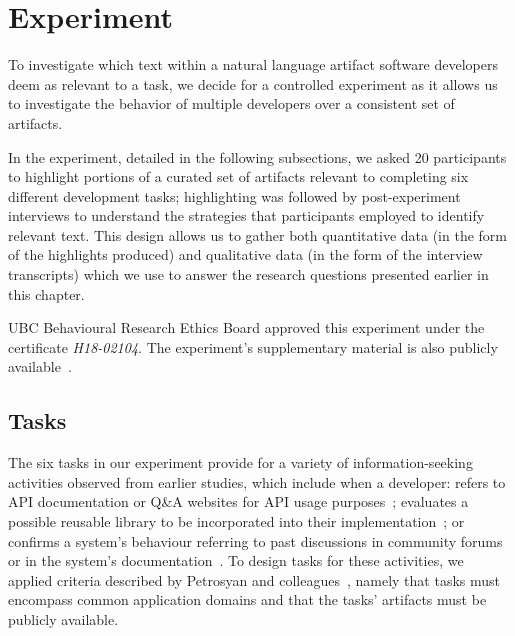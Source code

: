 
\section{Experiment}
\label{cp3:experiment}



To investigate which text within a natural language artifact software developers deem as relevant to a task,
 we decide for a controlled experiment
 as it allows us to investigate the behavior of multiple developers
over a consistent set of artifacts.



In the experiment, detailed in the following subsections,
we asked 20 participants to highlight portions of a curated
set of artifacts relevant to completing six different development tasks;
 highlighting was followed by post-experiment 
interviews to understand the
strategies that participants employed to identify relevant text.
This design allows us to gather both 
quantitative data (in the form of the highlights produced) 
and qualitative data (in the form of the interview transcripts) 
which we use to answer the research questions 
presented earlier in this chapter.






\acs{UBC} Behavioural Research Ethics Board  approved this experiment under the certificate \textit{H18-02104}.
The experiment's supplementary material is also publicly available~\cite{dssynthetic}.




\subsection{Tasks}
\label{cp3:method-tasks}


The six tasks in our experiment provide for a variety of information-seeking activities observed from earlier
studies, which include when a developer:
refers to API documentation or Q\&A websites for API usage purposes~\cite{umarji2008archetypal, Singer1998,robillard2011field};
evaluates a possible reusable library to be incorporated into their implementation~\cite{umarji2008archetypal}; or
confirms a system's behaviour referring to past discussions in community forums or in the system's documentation~\cite{umarji2008archetypal, Lotufo2012, Singer1998}.
To design tasks for these activities, we applied criteria described by Petrosyan and colleagues~\cite{Petrosyan2015}, namely that
tasks must encompass common application domains and that the tasks' artifacts must be publicly available.


